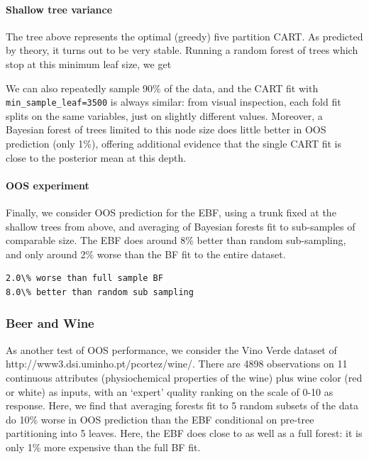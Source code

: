 \documentclass{article}
\begin{document}
\paragraph{Shallow tree variance}\label{shallow-tree-variance}

The tree above represents the optimal (greedy) five partition CART. As
predicted by theory, it turns out to be very stable. Running a random
forest of trees which stop at this minimum leaf size, we get


      
    
    We can also repeatedly sample 90\% of the data, and the CART fit with
\texttt{min\_sample\_leaf=3500} is always similar: from visual
inspection, each fold fit splits on the same variables, just on slightly
different values. Moreover, a Bayesian forest of trees limited to this
node size does little better in OOS prediction (only 1\%), offering
additional evidence that the single CART fit is close to the posterior
mean at this depth.
    
    \paragraph{OOS experiment}\label{oos-experiment}

Finally, we consider OOS prediction for the EBF, using a trunk fixed at
the shallow trees from above, and averaging of Bayesian forests fit to
sub-samples of comparable size. The EBF does around 8\% better than
random sub-sampling, and only around 2\% worse than the BF fit to the
entire dataset.


    \begin{verbatim}
2.0\% worse than full sample BF
8.0\% better than random sub sampling
    \end{verbatim}
   
\subsubsection{Beer and Wine}\label{another-example-wine-quality}

As another test of OOS performance, we consider the Vino Verde dataset
of http://www3.dsi.uminho.pt/pcortez/wine/. There are 4898 observations
on 11 continuous attributes (physiochemical properties of the wine) plus
wine color (red or white) as inputs, with an `expert' quality ranking on
the scale of 0-10 as response. Here, we find that averaging forests fit
to 5 random subsets of the data do 10\% worse in OOS prediction than the
EBF conditional on pre-tree partitioning into 5 leaves. Here, the EBF
does close to as well as a full forest: it is only 1\% more expensive
than the full BF fit.
\end{document}
